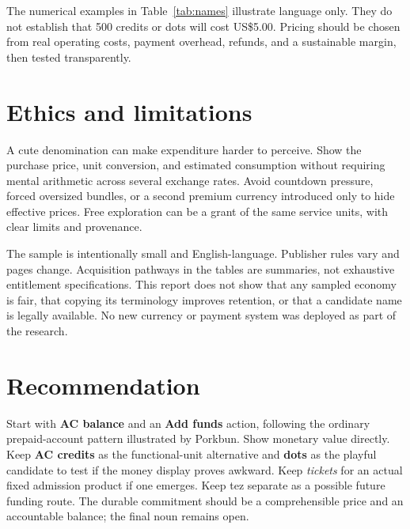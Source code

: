\documentclass[10pt,letterpaper,twocolumn]{article}
\begin{document}
The numerical examples in Table~\ref{tab:names} illustrate language only. They do not establish that 500 credits or dots will cost US\$5.00. Pricing should be chosen from real operating costs, payment overhead, refunds, and a sustainable margin, then tested transparently.

\section{Ethics and limitations}
A cute denomination can make expenditure harder to perceive. Show the purchase price, unit conversion, and estimated consumption without requiring mental arithmetic across several exchange rates. Avoid countdown pressure, forced oversized bundles, or a second premium currency introduced only to hide effective prices. Free exploration can be a grant of the same service units, with clear limits and provenance.

The sample is intentionally small and English-language. Publisher rules vary and pages change. Acquisition pathways in the tables are summaries, not exhaustive entitlement specifications. This report does not show that any sampled economy is fair, that copying its terminology improves retention, or that a candidate name is legally available. No new currency or payment system was deployed as part of the research.

\balance
\section{Recommendation}
Start with \textbf{AC balance} and an \textbf{Add funds} action, following the ordinary prepaid-account pattern illustrated by Porkbun. Show monetary value directly. Keep \textbf{AC credits} as the functional-unit alternative and \textbf{dots} as the playful candidate to test if the money display proves awkward. Keep \emph{tickets} for an actual fixed admission product if one emerges. Keep tez separate as a possible future funding route. The durable commitment should be a comprehensible price and an accountable balance; the final noun remains open.
\end{document}
